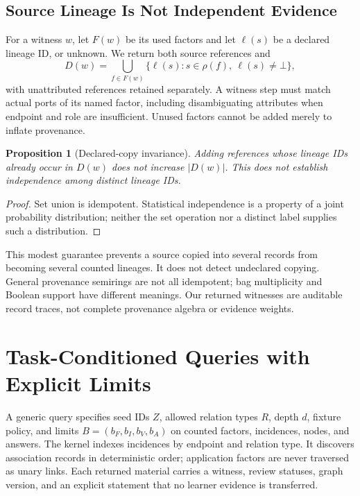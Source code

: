 \documentclass{article}
\newtheorem{proposition}{Proposition}
\begin{document}
\subsection{Source Lineage Is Not Independent Evidence}

For a witness $w$, let $F(w)$ be its used factors and let $\ell(s)$ be a declared lineage ID, or unknown. We return both source references and
\begin{equation}
 D(w)=\bigcup_{f\in F(w)}\{\ell(s):s\in\rho(f),\ \ell(s)\ne\bot\},
\end{equation}
with unattributed references retained separately. A witness step must match actual ports of its named factor, including disambiguating attributes when endpoint and role are insufficient. Unused factors cannot be added merely to inflate provenance.

\begin{proposition}[Declared-copy invariance]
Adding references whose lineage IDs already occur in $D(w)$ does not increase $|D(w)|$. This does not establish independence among distinct lineage IDs.
\end{proposition}
\begin{proof}
Set union is idempotent. Statistical independence is a property of a joint probability distribution; neither the set operation nor a distinct label supplies such a distribution.
\end{proof}

This modest guarantee prevents a source copied into several records from becoming several counted lineages. It does not detect undeclared copying. General provenance semirings are not all idempotent; bag multiplicity and Boolean support have different meanings. Our returned witnesses are auditable record traces, not complete provenance algebra or evidence weights.

\section{Task-Conditioned Queries with Explicit Limits}
\label{sec:queries}

A generic query specifies seed IDs $Z$, allowed relation types $R$, depth $d$, fixture policy, and limits $B=(b_F,b_I,b_V,b_A)$ on counted factors, incidences, nodes, and answers. The kernel indexes incidences by endpoint and relation type. It discovers association records in deterministic order; application factors are never traversed as unary links. Each returned material carries a witness, review statuses, graph version, and an explicit statement that no learner evidence is transferred.
\end{document}

